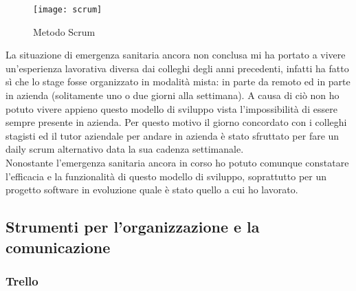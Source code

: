 \begin{figure}[H]
	\begin{center}
		\texttt{[image: scrum]}
		\caption{Metodo Scrum}
	\end{center}
\end{figure}
La situazione di emergenza sanitaria ancora non conclusa mi ha portato a vivere un'esperienza lavorativa diversa dai colleghi degli anni precedenti, infatti ha fatto sì che lo stage fosse organizzato in modalità mista: in parte da remoto ed in parte in azienda (solitamente uno o due giorni alla settimana). A causa di ciò non ho potuto vivere appieno questo modello di sviluppo vista l'impossibilità di essere sempre presente in azienda. Per questo motivo il giorno concordato con i colleghi stagisti ed il tutor aziendale per andare in azienda è stato sfruttato per fare un daily scrum alternativo data la sua cadenza settimanale.\\ 
Nonostante l'emergenza sanitaria ancora in corso ho potuto comunque constatare l’efficacia e la funzionalità di questo modello di sviluppo, soprattutto per un progetto software in evoluzione quale è stato quello a cui ho lavorato.\\

\subsection{Strumenti per l'organizzazione e la comunicazione}

\subsubsection{Trello}

